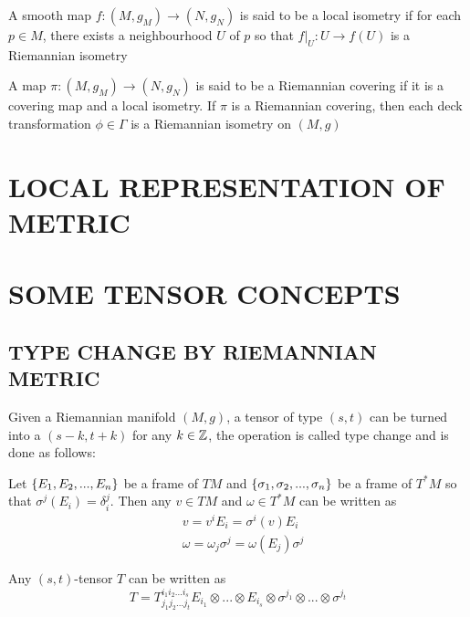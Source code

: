 \begin{definition}
	A smooth map $f: (M, g_M) \to (N, g_N)$ is said to be a local isometry if for each $p \in M$, there exists a neighbourhood $U$ of $p$ so that $f\vert_U: U \to f(U)$ is a Riemannian isometry
\end{definition}

\begin{definition}
	A map $\pi: (M, g_M) \to (N, g_N)$ is said to be a Riemannian covering if it is a covering map and a local isometry. If $\pi$ is a Riemannian covering, then each deck transformation $\phi \in \Gamma$ is a Riemannian isometry on $(M, g)$
\end{definition}

\section{LOCAL REPRESENTATION OF METRIC}


\section{SOME TENSOR CONCEPTS}

\subsection{TYPE CHANGE BY RIEMANNIAN METRIC}

Given a Riemannian manifold $(M, g)$, a tensor of type $(s, t)$ can be turned into a $(s-k, t+k)$ for any $k \in \mathbb{Z}$, the operation is called type change and is done as follows: 

Let $\{E_1, E_2, ..., E_n\}$ be a frame of $TM$ and $\{\sigma_1, \sigma_2, ..., \sigma_n\}$ be a frame of $T^*M$ so that $\sigma^j(E_i) = \delta_i^j$. Then any $v \in TM$ and $\omega \in T^* M$ can be written as
\begin{align*}
	&v = v^i E_i = \sigma^i(v) E_i \\
	&\omega = \omega_j \sigma^j = \omega(E_j) \sigma^j
\end{align*}

Any $(s, t)$-tensor $T$ can be written as
$$
	T = T_{j_1 j_2 ... j_t}^{i_1 i_2 ... i_s} E_{i_1} \otimes ... \otimes E_{i_s} \otimes \sigma^{j_1} \otimes ... \otimes \sigma^{j_t}
$$

